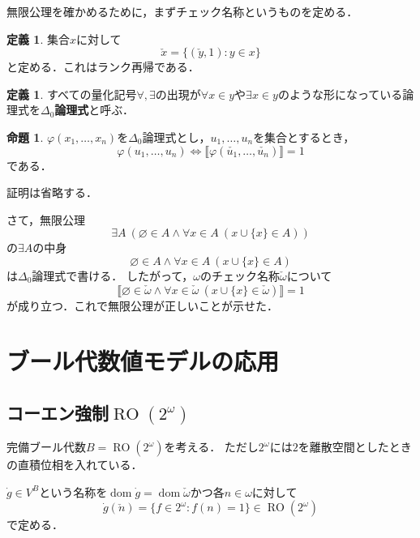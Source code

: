 \documentclass[uplatex,dvipdfmx]{jsarticle}
\newcommand{\dom}{\operatorname{dom}}
\newcommand{\RO}{\operatorname{RO}}
\renewcommand\emptyset{\varnothing}
\newcommand{\truth}[1] {\llbracket #1 \rrbracket}
\theoremstyle{definition}
\newtheorem{defi}[thm]{定義}
\newtheorem{prop}[thm]{命題}
\begin{document}
無限公理を確かめるために，まずチェック名称というものを定める．

\begin{defi}
集合$x$に対して
\[
\check{x} = \{ (\check{y}, 1) : y \in x \}
\]
と定める．これはランク再帰である．
\end{defi}

\begin{defi}
すべての量化記号$\forall, \exists$の出現が$\forall x \in y$や$\exists x \in y$のような形になっている論理式を{\bfseries $\Delta_0$論理式}と呼ぶ．
\end{defi}

\begin{prop}
$\varphi(x_1, \dots, x_n)$を$\Delta_0$論理式とし，$u_1, \dots, u_n$を集合とするとき，
\[
\varphi(u_1, \dots, u_n) \iff \truth{\varphi(\check{u_1}, \dots, \check{u_n})} = 1
\]
である．
\end{prop}
証明は省略する．

さて，無限公理
\[
\exists A\ (\emptyset \in A \land \forall x \in A\ (x \cup \{x\} \in A))
\]
の$\exists A$の中身
\[
\emptyset \in A \land \forall x \in A\ (x \cup \{x\} \in A)
\]
は$\Delta_0$論理式で書ける．
したがって，$\omega$のチェック名称$\check{\omega}$について
\[
\truth{\emptyset \in \check{\omega} \land \forall x \in \check{\omega}\ (x \cup \{x\} \in \check{\omega})} = 1
\]
が成り立つ．これで無限公理が正しいことが示せた．

\section{ブール代数値モデルの応用}

\subsection{コーエン強制$\RO(2^\omega)$}

完備ブール代数$B = \RO(2^\omega)$を考える．
ただし$2^\omega$には$2$を離散空間としたときの直積位相を入れている．

$\dot{g} \in V^B$という名称を$\dom \dot{g} = \dom \check{\omega}$かつ各$n \in \omega$に対して
\[
\dot{g}(\check{n}) = \{ f \in 2^\omega : f(n) = 1 \} \in \RO(2^\omega)
\]
で定める．
\end{document}
